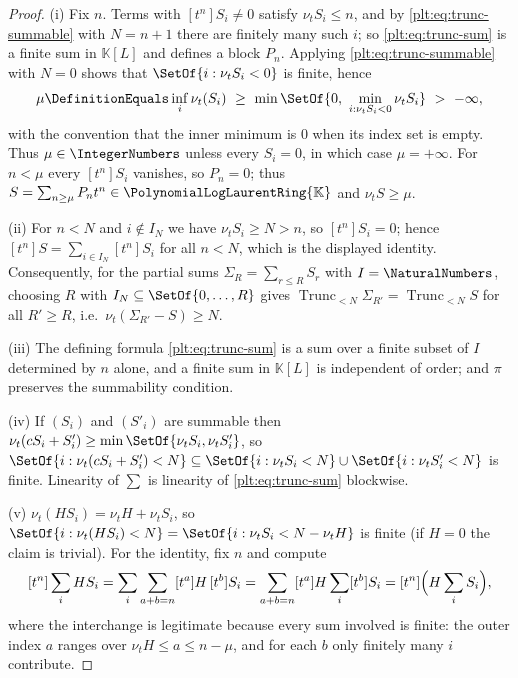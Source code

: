 \documentclass[11pt,oneside]{article}
\theoremstyle{plain}
\theoremstyle{definition}
\theoremstyle{remark}
\newcommand{\K}{\mathbb{K}}
\newcommand{\PLlau}{\PolynomialLogLaurentRing{\K}}       %
\newcommand{\ordt}{\nu_{t}}                              %
\newcommand{\Trunc}[2]{\operatorname{Trunc}_{<#2}#1}     %
\begin{document}
\begin{proof}
(i)  Fix \(n\).  Terms with \([t^n]S_i\ne0\) satisfy \(\ordt S_i\le n\), and
by \eqref{plt:eq:trunc-summable} with \(N=n+1\) there are finitely many such
\(i\); so \eqref{plt:eq:trunc-sum} is a finite sum in \(\K[L]\) and defines a
block \(P_n\).  Applying \eqref{plt:eq:trunc-summable} with \(N=0\) shows that
\(\SetOf{i:\ordt S_i<0}\) is finite, hence
\[
  \mu\DefinitionEquals\inf_i\ordt(S_i)
  \ \ge\ \min\SetOf{0,\ \min_{i:\ordt S_i<0}\ordt S_i}\ >\ -\infty ,
\]
with the convention that the inner minimum is \(0\) when its index set is
empty.  Thus \(\mu\in\IntegerNumbers\) unless every \(S_i=0\), in which case
\(\mu=+\infty\).  For \(n<\mu\) every
\([t^n]S_i\) vanishes, so \(P_n=0\); thus \(S=\sum_{n\ge\mu}P_nt^n\in\PLlau\)
and \(\ordt S\ge\mu\).

(ii)  For \(n<N\) and \(i\notin I_N\) we have \(\ordt S_i\ge N>n\), so
\([t^n]S_i=0\); hence \([t^n]S=\sum_{i\in I_N}[t^n]S_i\) for all \(n<N\),
which is the displayed identity.  Consequently, for the partial sums
\(\Sigma_R=\sum_{r\le R}S_r\) with \(I=\NaturalNumbers\), choosing \(R\) with
\(I_N\subseteq\SetOf{0,\dots,R}\) gives \(\Trunc{\Sigma_{R'}}{N}=\Trunc{S}{N}\)
for all \(R'\ge R\), i.e.\ \(\ordt(\Sigma_{R'}-S)\ge N\).

(iii)  The defining formula \eqref{plt:eq:trunc-sum} is a sum over a finite
subset of \(I\) determined by \(n\) alone, and a finite sum in \(\K[L]\) is
independent of order; and \(\pi\) preserves the summability condition.

(iv)  If \((S_i)\) and \((S'_i)\) are summable then
\(\ordt(cS_i+S'_i)\ge\min\SetOf{\ordt S_i,\ordt S'_i}\), so
\(\SetOf{i:\ordt(cS_i+S'_i)<N}\subseteq\SetOf{i:\ordt S_i<N}\cup
\SetOf{i:\ordt S'_i<N}\) is finite.  Linearity of \(\sum\) is linearity of
\eqref{plt:eq:trunc-sum} blockwise.

(v)  \(\ordt(HS_i)=\ordt H+\ordt S_i\), so
\(\SetOf{i:\ordt(HS_i)<N}=\SetOf{i:\ordt S_i<N-\ordt H}\) is finite (if
\(H=0\) the claim is trivial).  For the identity, fix \(n\) and compute
\[
  [t^n]\sum_iHS_i
  =\sum_i\sum_{a+b=n}[t^a]H\,[t^b]S_i
  =\sum_{a+b=n}[t^a]H\sum_i[t^b]S_i
  =[t^n]\Bigl(H\sum_iS_i\Bigr),
\]
where the interchange is legitimate because every sum involved is finite: the
outer index \(a\) ranges over \(\ordt H\le a\le n-\mu\), and for each \(b\)
only finitely many \(i\) contribute.


\end{proof}
\end{document}
